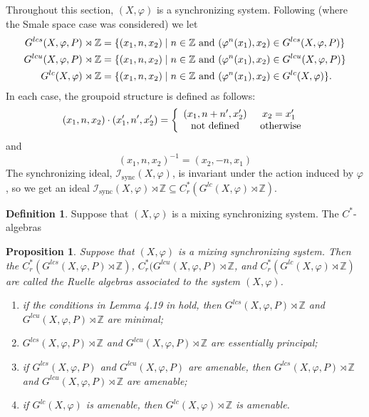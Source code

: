 \documentclass{amsart}
\newcommand{\Z}{{\mathbb Z}}
\theoremstyle{plain}
\newtheorem{proposition}[theorem]{Proposition}
\theoremstyle{definition}
\newtheorem{definition}[theorem]{Definition}
\theoremstyle{remark}
\begin{document}
Throughout this section, $(X, \varphi)$ is a synchronizing system. Following \cite{putnam99} (where the Smale space case was considered) we let
\begin{align*}
G^{lcs}(X, \varphi, P) \rtimes \Z & = \{ (x_1, n , x_2) \mid n\in \Z \hbox{ and }(\varphi^n(x_1), x_2) \in G^{lcs}(X, \varphi, P) \} \\
G^{lcu}(X, \varphi, P) \rtimes \Z & = \{ (x_1, n , x_2) \mid n\in \Z \hbox{ and }(\varphi^n(x_1), x_2) \in G^{lcu}(X, \varphi, P) \} \\
G^{lc}(X, \varphi) \rtimes \Z & = \{ (x_1, n , x_2) \mid n\in \Z \hbox{ and }(\varphi^n(x_1), x_2) \in G^{lc}(X, \varphi) \}.
\end{align*}
In each case, the groupoid structure is defined as follows:
\[
(x_1, n , x_2) \cdot (x_1^{\prime}, n^{\prime}, x_2^{\prime}) = \left\{ \begin{array}{cc} (x_1, n+n^{\prime}, x_2^{\prime}) & x_2=x_1^{\prime} \\ \hbox{not defined} & \hbox{ otherwise} \end{array} \right.
\]
and
\[
(x_1, n, x_2)^{-1}= (x_2, -n, x_1)
\]
The synchronizing ideal, $\mathcal{I}_\text{sync}(X,\varphi)$, is invariant under the action induced by $\varphi$, so we get an ideal $\mathcal{I}_\text{sync}(X,\varphi) \rtimes \Z \subseteq C^*_r(G^{lc}(X, \varphi) \rtimes \Z)$.
\begin{definition}
Suppose that $(X, \varphi)$ is a mixing synchronizing system. The $C^*$-algebras 

\end{definition}
\begin{proposition}
Suppose that $(X, \varphi)$ is a mixing synchronizing system. Then the $C^*_r(G^{lcs}(X, \varphi, P) \rtimes \Z)$, $C^*_r(G^{lcu}(X, \varphi, P) \rtimes \Z$, and $C^*_r(G^{lc}(X, \varphi) \rtimes \Z)$ are called the Ruelle algebras associated to the system $(X, \varphi)$.
\begin{enumerate}
\item if the conditions in Lemma 4.19 in \cite{DeeSto} hold, then $G^{lcs}(X, \varphi, P) \rtimes \Z$ and $G^{lcu}(X, \varphi, P) \rtimes \Z$ are minimal; 
\item $G^{lcs}(X, \varphi, P) \rtimes \Z$ and $G^{lcu}(X, \varphi, P) \rtimes \Z$ are essentially principal;
\item if $G^{lcs}(X, \varphi, P)$ and $G^{lcu}(X, \varphi, P)$ are amenable, then $G^{lcs}(X, \varphi, P) \rtimes \Z$ and $G^{lcu}(X, \varphi, P) \rtimes \Z$ are amenable;
\item if $G^{lc}(X, \varphi)$ is amenable, then $G^{lc}(X, \varphi) \rtimes \Z$ is amenable.
\end{enumerate}
\end{proposition}
\end{document}
